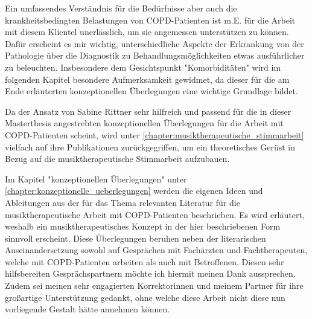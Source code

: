 Ein umfassendes Verständnis für die Bedürfnisse aber auch die krankheitsbedingten Belastungen von COPD-Patienten ist m.E. für die Arbeit mit diesem Klientel unerlässlich, um sie angemessen unterstützen zu können. Dafür erscheint es mir wichtig, unterschiedliche Aspekte der Erkrankung von der Pathologie über die Diagnostik zu Behandlungsmöglichkeiten etwas ausführlicher zu beleuchten. Insbesondere dem Gesichtspunkt "Komorbiditäten" wird im folgenden Kapitel besondere Aufmerksamkeit gewidmet, da dieser für die am Ende erläuterten konzeptionellen Überlegungen eine wichtige Grundlage bildet.

Da der Ansatz von Sabine Rittner sehr hilfreich und passend für die in dieser Masterthesis angestrebten konzeptionellen Überlegungen für die Arbeit mit COPD-Patienten scheint, wird unter \ref{chapter:musiktherapeutische_stimmarbeit} vielfach auf ihre Publikationen zurückgegriffen, um ein theoretisches Gerüst in Bezug auf die musiktherapeutische Stimmarbeit aufzubauen.

Im Kapitel "konzeptionellen Überlegungen" unter \ref{chapter:konzeptionelle_ueberlegungen} werden die eigenen Ideen und Ableitungen aus der für das Thema relevanten Literatur für die musiktherapeutische Arbeit mit COPD-Patienten beschrieben. Es wird erläutert, weshalb ein musiktherapeutisches Konzept in der hier beschriebenen Form sinnvoll erscheint. Diese Überlegungen beruhen neben der literarischen Auseinandersetzung sowohl auf Gesprächen mit Fachärzten und Fachtherapeuten, welche mit COPD-Patienten arbeiten als auch mit Betroffenen. Diesen sehr hilfsbereiten Gesprächspartnern möchte ich hiermit meinen Dank aussprechen. Zudem sei meinen sehr engagierten Korrektorinnen und meinem Partner für ihre großartige Unterstützung gedankt, ohne welche diese Arbeit nicht diese nun vorliegende Gestalt hätte annehmen können.

\newpage\thispagestyle{empty}